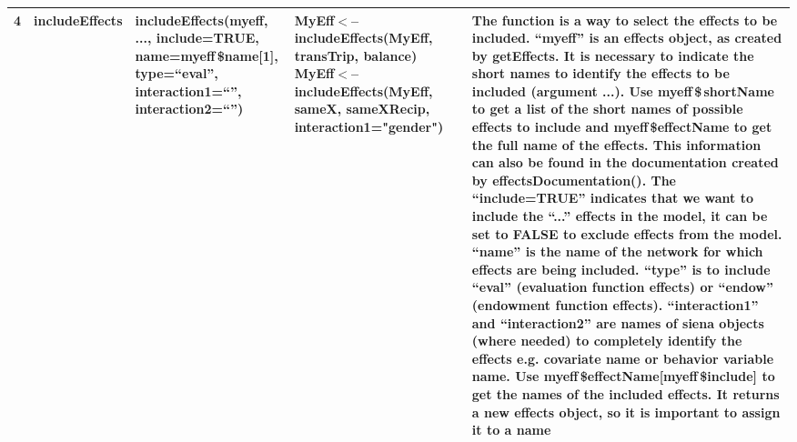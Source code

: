 \documentclass[a4paper,fleqn,11pt]{article}
\newcommand{\+}{\, + \,}
\begin{document}
\begin{landscape}
\begin{small}
\begin{longtable}{c | p{2.4cm} | p{4.5cm} | p{4.0cm} | p{9.0cm} }
4 & includeEffects & includeEffects(myeff, ..., \newline include=TRUE, \newline
name=myeff{\,\$}name[1], type=``eval'', \newline
interaction1=``'',\newline
interaction2=``'') & {MyEff$<$--includeEffects(MyEff, transTrip, balance)
\flushleft MyEff$<$--includeEffects(MyEff, sameX, \newline
sameXRecip, \newline
interaction1="gender")}
 &The function is a
way to select the effects to be included. ``myeff'' is an effects object, as
created by getEffects. It is necessary to indicate the short names to identify
the effects to be included (argument ...).
Use myeff{\,\$\,}shortName to get a list
of the short names of possible effects to include and myeff{\,\$}effectName to get
the full name of the effects. This information can also be found in the
documentation created by effectsDocumentation(). The ``include=TRUE'' indicates
that we want to include the ``...'' effects in the model, it can be set to
FALSE to exclude effects from the model. ``name'' is the name of the network
for which effects are being included. ``type'' is to include ``eval''
(evaluation function effects) or ``endow'' (endowment function effects).
``interaction1'' and ``interaction2'' are names of siena objects (where needed)
to completely identify the effects e.g. covariate name or behavior variable
name. Use myeff{\,\$}effectName[myeff{\,\$}include]
to get the names of the included
effects. It returns a new effects object, so it is important to assign it to a
name\\
\hline


\end{longtable}
\end{small}
\end{landscape}
\end{document}
